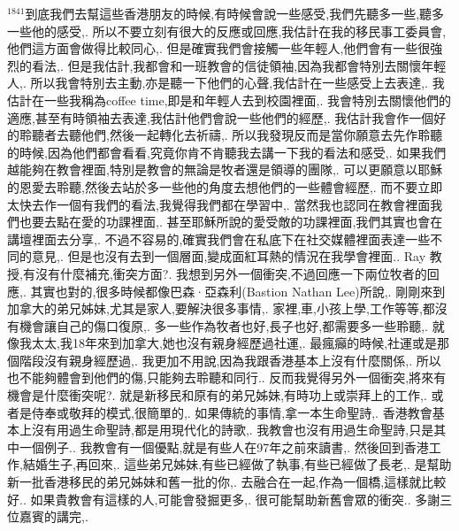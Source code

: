 \documentclass{book}
\begin{document}
$^{1841}$到底我們去幫這些香港朋友的時候,有時候會說一些感受,我們先聽多一些,聽多一些他的感受,.
所以不要立刻有很大的反應或回應,我估計在我的移民事工委員會,他們這方面會做得比較同心,.
但是確實我們會接觸一些年輕人,他們會有一些很強烈的看法,.
但是我估計,我都會和一班教會的信徒領袖,因為我都會特別去關懷年輕人,.
所以我會特別去主動,亦是聽一下他們的心聲,我估計在一些感受上去表達,.
我估計在一些我稱為coffee time,即是和年輕人去到校園裡面,.
我會特別去關懷他們的適應,甚至有時領袖去表達,我估計他們會說一些他們的經歷,.
我估計我會作一個好的聆聽者去聽他們,然後一起轉化去祈禱,.
所以我發現反而是當你願意去先作聆聽的時候,因為他們都會看看,究竟你肯不肯聽我去講一下我的看法和感受,.
如果我們越能夠在教會裡面,特別是教會的無論是牧者還是領導的團隊,.
可以更願意以耶穌的恩愛去聆聽,然後去站於多一些他的角度去想他們的一些體會經歷,.
而不要立即太快去作一個有我們的看法,我覺得我們都在學習中,.
當然我也認同在教會裡面我們也要去點在愛的功課裡面,.
甚至耶穌所說的愛受敵的功課裡面,我們其實也會在講壇裡面去分享,.
不過不容易的,確實我們會在私底下在社交媒體裡面表達一些不同的意見,.
但是也沒有去到一個層面,變成面紅耳熱的情況在我學會裡面..
Ray 教授,有沒有什麼補充,衝突方面?.
我想到另外一個衝突,不過回應一下兩位牧者的回應,.
其實也對的,很多時候都像巴森·亞森利(Bastion Nathan Lee)所說,.
剛剛來到加拿大的弟兄姊妹,尤其是家人,要解決很多事情,.
家裡,車,小孩上學,工作等等,都沒有機會讓自己的傷口復原,.
多一些作為牧者也好,長子也好,都需要多一些聆聽,.
就像我太太,我18年來到加拿大,她也沒有親身經歷過社運,.
最瘋癲的時候,社運或是那個階段沒有親身經歷過,.
我更加不用說,因為我跟香港基本上沒有什麼關係,.
所以也不能夠體會到他們的傷,只能夠去聆聽和同行..
反而我覺得另外一個衝突,將來有機會是什麼衝突呢?.
就是新移民和原有的弟兄姊妹,有時功上或崇拜上的工作,.
或者是侍奉或敬拜的模式,很簡單的,.
如果傳統的事情,拿一本生命聖詩,.
香港教會基本上沒有用過生命聖詩,都是用現代化的詩歌,.
我教會也沒有用過生命聖詩,只是其中一個例子..
我教會有一個優點,就是有些人在97年之前來讀書,.
然後回到香港工作,結婚生子,再回來,.
這些弟兄姊妹,有些已經做了執事,有些已經做了長老,.
是幫助新一批香港移民的弟兄姊妹和舊一批的你,.
去融合在一起,作為一個橋,這樣就比較好..
如果貴教會有這樣的人,可能會發掘更多,.
很可能幫助新舊會眾的衝突..
多謝三位嘉賓的講完,.
\end{document}
